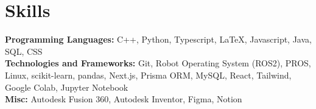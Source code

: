 \documentclass[11pt]{article}       %
\begin{document}
\vspace{-18.5pt}


\section*{Skills}

\textbf{Programming Languages:} C++, Python, Typescript, LaTeX, Javascript, Java, SQL, CSS\\
\textbf{Technologies and Frameworks:} Git, Robot Operating System (ROS2), PROS, Linux, scikit-learn, pandas, Next.js, Prisma ORM, MySQL, React, Tailwind, Google Colab, Jupyter Notebook\\
\textbf{Misc:} Autodesk Fusion 360, Autodesk Inventor, Figma, Notion\\

\vspace{-6.5pt}
\end{document}
